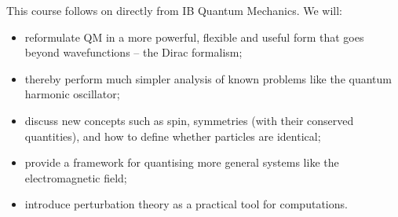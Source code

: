 \documentclass[../Main.tex]{subfiles}
\begin{document}
This course follows on directly from IB Quantum Mechanics. We will:
\begin{itemize}
    \item reformulate QM in a more powerful, flexible and useful form that goes beyond wavefunctions -- the Dirac formalism;
    \item thereby perform much simpler analysis of known problems like the quantum harmonic oscillator;
    \item discuss new concepts such as spin, symmetries (with their conserved quantities), and how to define whether particles are identical;
    \item provide a framework for quantising more general systems like the electromagnetic field;
    \item introduce perturbation theory as a practical tool for computations.
\end{itemize}
\end{document}
